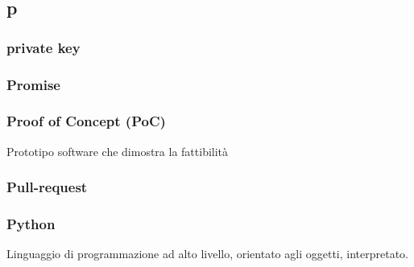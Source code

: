 \subsection*{\textbf{\hfill \Huge{p} \hfill}} 
\subsubsection*{private key}

\subsubsection*{Promise}

\subsubsection*{Proof of Concept (PoC)}
Prototipo software che dimostra la fattibilità 
\subsubsection*{Pull-request}

\subsubsection*{Python}
Linguaggio di programmazione ad alto livello, orientato agli oggetti, interpretato.
